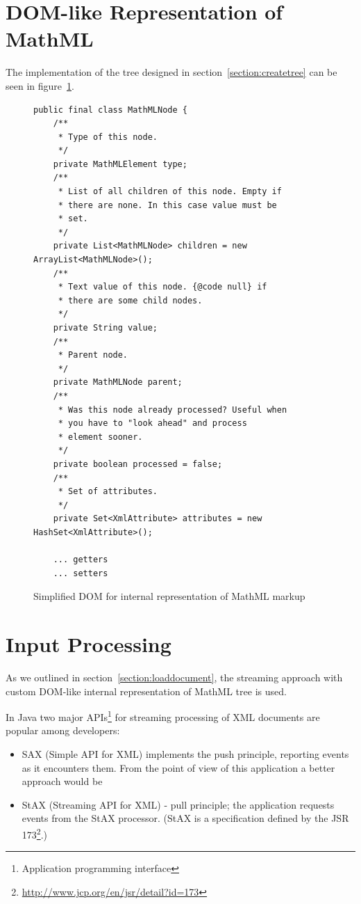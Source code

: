 \documentclass[11pt,oneside,final]{fithesis2}
\begin{document}
\section{DOM-like Representation of MathML}
The implementation of the tree designed in section~\ref{section:createtree} can be seen in figure~\ref{fig:customdom}.

\begin{figure}[!ht]
\begin{lstlisting}
public final class MathMLNode {
    /**
     * Type of this node.
     */
    private MathMLElement type;
    /**
     * List of all children of this node. Empty if 
     * there are none. In this case value must be 
     * set.
     */
    private List<MathMLNode> children = new ArrayList<MathMLNode>();
    /**
     * Text value of this node. {@code null} if 
     * there are some child nodes.
     */
    private String value;
    /**
     * Parent node.
     */
    private MathMLNode parent;
    /**
     * Was this node already processed? Useful when 
     * you have to "look ahead" and process
     * element sooner.
     */
    private boolean processed = false;
    /**
     * Set of attributes.
     */
    private Set<XmlAttribute> attributes = new HashSet<XmlAttribute>();
    
    ... getters
    ... setters
\end{lstlisting}
\caption{Simplified DOM for internal representation of MathML markup}
\label{fig:customdom}
\end{figure}

\section{Input Processing}
As we outlined in section~\ref{section:loaddocument}, the streaming approach with custom DOM-like internal representation of MathML tree is used. 

In Java two major APIs\footnote{Application programming interface} for streaming processing of XML documents are popular among developers:
\begin{itemize}
\item SAX (Simple API for XML) implements the push principle, reporting events as it encounters them. From the point of view of this application a better approach would be
\item StAX (Streaming API for XML) - pull principle; the application requests events from the StAX processor. (StAX is a specification defined by the JSR 173\footnote{\url{http://www.jcp.org/en/jsr/detail?id=173}}.)
\end{itemize}
\end{document}
